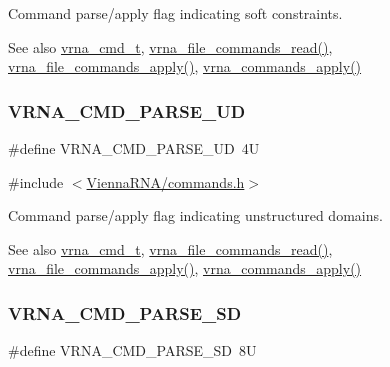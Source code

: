 Command parse/apply flag indicating soft constraints. 

\begin{DoxySeeAlso}{See also}
\mbox{\hyperlink{group__command__files_gaf31afe4c5f8e4bf44a670ab4c3dcd916}{vrna\+\_\+cmd\+\_\+t}}, \mbox{\hyperlink{group__command__files_gae5f56400ed43683338f7bf1c1102655a}{vrna\+\_\+file\+\_\+commands\+\_\+read()}}, \mbox{\hyperlink{group__command__files_gadbe8c9622f7bcc6dcbe3448b98df8656}{vrna\+\_\+file\+\_\+commands\+\_\+apply()}}, \mbox{\hyperlink{group__command__files_gac65d0fe86f7671a2d2b85dda1a3ddc16}{vrna\+\_\+commands\+\_\+apply()}} 
\end{DoxySeeAlso}
\mbox{\label{group__command__files_ga6c6409780698826b04ebfed9151d7649}} 
\subsubsection{\texorpdfstring{VRNA\_CMD\_PARSE\_UD}{VRNA\_CMD\_PARSE\_UD}}
{\footnotesize\ttfamily \#define V\+R\+N\+A\+\_\+\+C\+M\+D\+\_\+\+P\+A\+R\+S\+E\+\_\+\+UD~4U}



{\ttfamily \#include $<$\mbox{\hyperlink{commands_8h}{Vienna\+R\+N\+A/commands.\+h}}$>$}



Command parse/apply flag indicating unstructured domains. 

\begin{DoxySeeAlso}{See also}
\mbox{\hyperlink{group__command__files_gaf31afe4c5f8e4bf44a670ab4c3dcd916}{vrna\+\_\+cmd\+\_\+t}}, \mbox{\hyperlink{group__command__files_gae5f56400ed43683338f7bf1c1102655a}{vrna\+\_\+file\+\_\+commands\+\_\+read()}}, \mbox{\hyperlink{group__command__files_gadbe8c9622f7bcc6dcbe3448b98df8656}{vrna\+\_\+file\+\_\+commands\+\_\+apply()}}, \mbox{\hyperlink{group__command__files_gac65d0fe86f7671a2d2b85dda1a3ddc16}{vrna\+\_\+commands\+\_\+apply()}} 
\end{DoxySeeAlso}
\mbox{\label{group__command__files_gaf5e20210173cdb83bf70256a454f284b}} 
\subsubsection{\texorpdfstring{VRNA\_CMD\_PARSE\_SD}{VRNA\_CMD\_PARSE\_SD}}
{\footnotesize\ttfamily \#define V\+R\+N\+A\+\_\+\+C\+M\+D\+\_\+\+P\+A\+R\+S\+E\+\_\+\+SD~8U}



